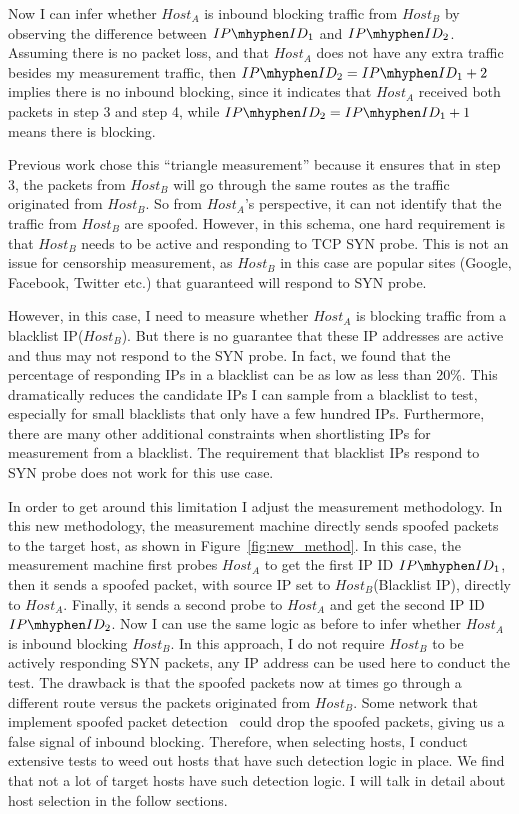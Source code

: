 Now I can infer whether $Host_A$ is inbound blocking traffic from $Host_B$ by
observing the difference between $IP\mhyphen ID_1$ and $IP\mhyphen ID_2$.
Assuming there is no packet loss, and that $Host_A$ does not have any extra
traffic besides my measurement traffic, then
$IP\mhyphen ID_2 = IP\mhyphen ID_1 + 2$ implies there is no inbound blocking,
since it indicates that $Host_A$ received both packets in step 3 and step 4,
while $IP\mhyphen ID_2 = IP\mhyphen ID_1 + 1$ means there is blocking.

Previous work chose this ``triangle measurement'' because it ensures that in
step 3, the packets from $Host_B$ will go through the same routes as the
traffic originated from $Host_B$. So from $Host_A$'s perspective, it can not
identify that the traffic from $Host_B$ are spoofed. However, in this schema,
one hard requirement is that $Host_B$ needs to be active and responding to TCP
SYN probe. This is not an issue for censorship measurement, as $Host_B$ in this
case are popular sites (Google, Facebook, Twitter etc.) that guaranteed will
respond to SYN probe.

However, in this case, I need to measure whether $Host_A$ is blocking traffic
from a blacklist IP($Host_B$). But there is no guarantee that these IP
addresses are active and thus may not respond to the SYN probe. In fact, we
found that the percentage of responding IPs in a blacklist can be as low as less
than 20\%. This dramatically reduces the candidate IPs I can sample from a
blacklist to test, especially for small blacklists that only have a few hundred
IPs. Furthermore, there are many other additional constraints when shortlisting
IPs for measurement from a blacklist.
The requirement that blacklist IPs respond to SYN probe does not work for this
use case. 

In order to get around this limitation I adjust the measurement methodology.
In this new methodology, the measurement machine directly sends spoofed
packets to the target host, as shown in Figure~\ref{fig:new_method}. In
this case, the measurement machine first probes $Host_A$ to get the first IP ID
$IP\mhyphen ID_1$, then it sends a spoofed packet, with source IP set to
$Host_B$(Blacklist IP), directly to $Host_A$. Finally, it sends a second probe
to $Host_A$ and get the second IP ID $IP\mhyphen ID_2$. Now I can use the same
logic as before to infer whether $Host_A$ is inbound blocking $Host_B$. In this
approach, I do not require $Host_B$ to be actively responding SYN packets, any
IP address can be used here to conduct the test. The drawback is that the
spoofed packets now at times go through a different route versus the packets
originated from $Host_B$. Some network that implement spoofed packet
detection~\cite{ferguson2000rfc2827} could drop the spoofed packets, giving us
a false signal of inbound blocking. Therefore, when selecting hosts, I conduct
extensive tests to weed out hosts that have such detection logic in place. We
find that not a lot of target hosts have such detection logic. I will talk in
detail about host selection in the follow sections.

